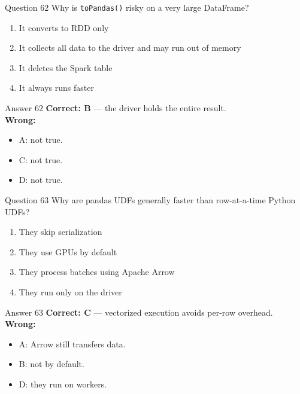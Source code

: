 \documentclass[aspectratio=169,11pt]{beamer}
\begin{document}
	\begin{frame}{Question 62}
		Why is \texttt{toPandas()} risky on a very large DataFrame?
		\begin{enumerate}[label=\Alph*.]
			\item It converts to RDD only
			\item It collects all data to the driver and may run out of memory
			\item It deletes the Spark table
			\item It always runs faster
		\end{enumerate}
	\end{frame}
	\begin{frame}{Answer 62}
		\textbf{Correct: B} --- the driver holds the entire result.\\
		\vspace{0.5em}
		\textbf{Wrong:}
		\begin{itemize}
			\item A: not true.
			\item C: not true.
			\item D: not true.
		\end{itemize}
	\end{frame}
	
	\begin{frame}{Question 63}
		Why are pandas UDFs generally faster than row-at-a-time Python UDFs?
		\begin{enumerate}[label=\Alph*.]
			\item They skip serialization
			\item They use GPUs by default
			\item They process batches using Apache Arrow
			\item They run only on the driver
		\end{enumerate}
	\end{frame}
	\begin{frame}{Answer 63}
		\textbf{Correct: C} --- vectorized execution avoids per-row overhead.\\
		\vspace{0.5em}
		\textbf{Wrong:}
		\begin{itemize}
			\item A: Arrow still transfers data.
			\item B: not by default.
			\item D: they run on workers.
		\end{itemize}
	\end{frame}
	
\end{document}
